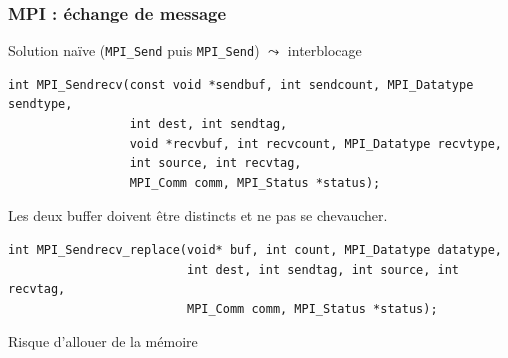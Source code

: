 \documentclass[xcolor={x11names,svgnames}]{beamer}
\begin{document}

\begin{frame}[fragile]
\frametitle{MPI : échange de message}

Solution naïve (\texttt{MPI_Send} puis \texttt{MPI_Send}) $\leadsto$ interblocage

\bigskip

\begin{verbatim}
int MPI_Sendrecv(const void *sendbuf, int sendcount, MPI_Datatype sendtype,
                 int dest, int sendtag,
                 void *recvbuf, int recvcount, MPI_Datatype recvtype,
                 int source, int recvtag,
                 MPI_Comm comm, MPI_Status *status);
\end{verbatim}

Les deux buffer doivent être distincts et ne pas se chevaucher.

\bigskip

\begin{verbatim}
int MPI_Sendrecv_replace(void* buf, int count, MPI_Datatype datatype,
                         int dest, int sendtag, int source, int recvtag,
                         MPI_Comm comm, MPI_Status *status);
\end{verbatim}

Risque d'allouer de la mémoire

\end{frame}

\end{document}
